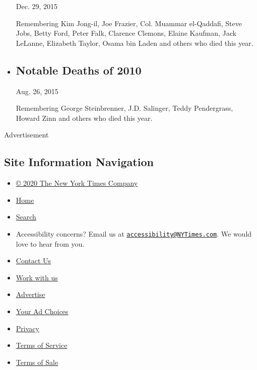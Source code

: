 \begin{itemize}
  Dec. 29, 2015

  Remembering Kim Jong-il, Joe Frazier, Col. Muammar el-Qaddafi, Steve
  Jobs, Betty Ford, Peter Falk, Clarence Clemons, Elaine Kaufman, Jack
  LeLanne, Elizabeth Taylor, Osama bin Laden and others who died this
  year.
\item
  \href{https://www.nytimes3xbfgragh.onion/interactive/obituaries/20100329_NOTABLEDEATHS.html}{}

  \hypertarget{notable-deaths-of-2010}{%
  \subsection{Notable Deaths of 2010}\label{notable-deaths-of-2010}}

  Aug. 26, 2015

  Remembering George Steinbrenner, J.D. Salinger, Teddy Pendergrass,
  Howard Zinn and others who died this year.
\end{itemize}

Advertisement

\hypertarget{site-information-navigation}{%
\subsection{Site Information
Navigation}\label{site-information-navigation}}

\begin{itemize}
\tightlist
\item
  \href{https://help.nytimes3xbfgragh.onion/hc/en-us/articles/115014792127-Copyright-notice}{©
  2020 The New York Times Company}
\item
  \href{https://www.nytimes3xbfgragh.onion}{Home}
\item
  \href{https://www.nytimes3xbfgragh.onion/search/}{Search}
\item
  Accessibility concerns? Email us at
  \href{mailto:accessibility@NYTimes.com}{\nolinkurl{accessibility@NYTimes.com}}.
  We would love to hear from you.
\item
  \href{https://help.nytimes3xbfgragh.onion/hc/en-us/articles/115015385887-Contact-Us}{Contact
  Us}
\item
  \href{https://www.nytco.com/careers/}{Work with us}
\item
  \href{https://nytmediakit.com/}{Advertise}
\item
  \href{https://help.nytimes3xbfgragh.onion/hc/en-us/articles/115014892108-Privacy-policy\#pp}{Your
  Ad Choices}
\item
  \href{https://help.nytimes3xbfgragh.onion/hc/en-us/articles/115014892108-Privacy-policy}{Privacy}
\item
  \href{https://help.nytimes3xbfgragh.onion/hc/en-us/articles/115014893428-Terms-of-service}{Terms
  of Service}
\item
  \href{https://help.nytimes3xbfgragh.onion/hc/en-us/articles/115014893968-Terms-of-sale}{Terms
  of Sale}
\end{itemize}

